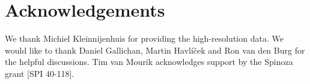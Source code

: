 \section{Acknowledgements}
We thank Michiel Kleinnijenhuis for providing the high-resolution data. We would like to thank Daniel Gallichan, Martin Havl\'i\v cek and Ron van den Burg for the helpful discussions. Tim van Mourik acknowledges support by the Spinoza grant [SPI 40-118].